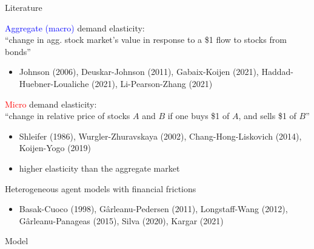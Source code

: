 \documentclass[12pt,aspectratio=169]{beamer}
\newenvironment{wideitemize}{\itemize\addtolength{\itemsep}{10pt}}{\enditemize}
\newenvironment{transitionframe}{
	\setbeamercolor{background canvas}{bg=mDarkBrown}
	\begin{frame}[plain, noframenumbering]}{
	\end{frame}
}
\begin{document}
\begin{frame}{Literature}
    \begin{wideitemize}
        \item \textcolor{blue}{Aggregate (macro)} demand elasticity:\\ {\footnotesize ``change in agg. stock market's value in response to a \$1 flow to stocks from bonds''}
        \begin{itemize}
            \item {\scriptsize Johnson (2006), Deuskar-Johnson (2011), Gabaix-Koijen (2021), Haddad-Huebner-Loualiche (2021), Li-Pearson-Zhang (2021)}
        \end{itemize}
        \item \textcolor{red}{Micro} demand elasticity:\\
        {\footnotesize ``change in relative price of stocks $A$ and $B$ if one buys \$1 of $A$, and sells \$1 of $B$''}
        \begin{itemize}
            \item {\scriptsize Shleifer (1986), Wurgler-Zhuravskaya (2002), Chang-Hong-Liskovich (2014), Koijen-Yogo (2019)}
            \item higher elasticity than the aggregate market 
        \end{itemize}
        \item Heterogeneous agent models with financial frictions
        \begin{itemize}
            \item {\scriptsize Basak-Cuoco (1998), Gârleanu-Pedersen (2011), Longstaff-Wang (2012), Gârleanu-Panageas (2015), Silva (2020), Kargar (2021)}
        \end{itemize}
    \end{wideitemize}
\end{frame}

\begin{frame}[standout]
        Model
\end{frame}

\end{document}
